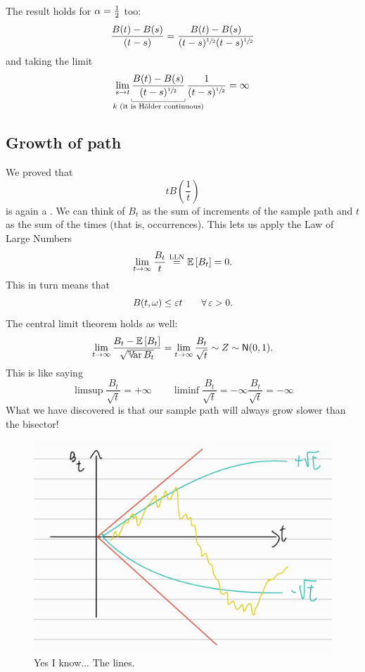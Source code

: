 \documentclass[12pt]{report}
\begin{document}
\begin{remark}
	The result holds for $\alpha=\frac{1}{2}$ too:
	\begin{equation*}
		\frac{B(t)-B(s)}{(t-s)}=\frac{B(t)-B(s)}{(t-s)^{\sfrac{1}{2}}(t-s)^{\sfrac{1}{2}}}
	\end{equation*}
	and taking the limit
	\begin{equation*}
		\lim_{s\to t}\ubracketthin{\frac{B(t)-B(s)}{(t-s)^{\sfrac{1}{2}}}}_{\mathclap{k \text{ (it is Hölder continuous)}}}\frac{1}{(t-s)^{\sfrac{1}{2}}}=\infty
	\end{equation*}
\end{remark}
\subsection{Growth of \bwm{} path}
We proved that 
\begin{equation*}
	tB\left(\frac{1}{t}\right)
\end{equation*}
is again a \bwm. 
	We can think of $B_{t}$ as the sum of increments of the sample path and $t$ as the sum of the times (that is, occurrences). This lets us apply the Law of Large Numbers
	\begin{equation*}
		\lim_{t\to\infty}\frac{B_{t}}{t}\stackrel{\mathrm{LLN}}{=}\mathbb{E}\left[B_{t}\right]=0.
	\end{equation*}
	This in turn means that
	\begin{equation*}
		B(t,\omega)\leq \varepsilon t\qquad\forall\,\varepsilon>0.
	\end{equation*}
The central limit theorem holds as well:
\begin{equation*}
	\lim_{t\to\infty}\frac{B_{t}-\mathbb{E}\left[B_{t}\right]}{\sqrt{\mathbb{V}\!\mathrm{ar}\, B_{t}}}=\lim_{t\to\infty}\frac{B_{t}}{\sqrt{t}}\sim Z\sim \mathsf{N}(0,1).
\end{equation*}
This is like saying
\begin{equation*}
	\limsup\frac{B_{t}}{\sqrt{t}}=+\infty\qquad\liminf\frac{B_{t}}{\sqrt{t}}=-\infty\frac{B_{t}}{\sqrt{t}}=-\infty
\end{equation*}
What we have discovered is that our sample path will always grow slower than the bisector!
\begin{figure}[H]
	\centering
	\includegraphics[width=0.5\linewidth]{img/screenshot043}
	\caption{Yes I know... The lines.}
	\label{fig:screenshot043}
\end{figure}
\end{document}
